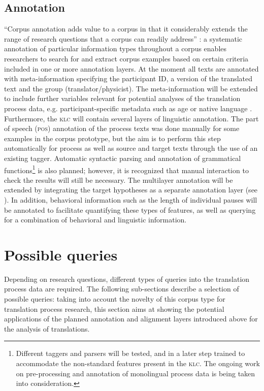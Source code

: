 \documentclass[output=paper]{LSP/langsci}
\begin{document}
\subsection{Annotation} \label{sec:1:2:3}
“Corpus annotation adds value to a corpus in that it considerably extends the range of research questions that a corpus can readily address” \citep[29]{McEnery2006}: a systematic annotation of particular information types throughout a corpus enables researchers to search for and extract corpus examples based on certain criteria included in one or more annotation layers. At the moment all texts are annotated with meta-information specifying the participant ID, a version of the translated text and the group (translator/physicist). The meta-information will be extended to include further variables relevant for potential analyses of the translation process data, e.g. participant-specific metadata such as age or native language \citep[see][]{Hvelplund2012}. Furthermore, the \textsc{klc} will contain several layers of linguistic annotation. The part of speech (\textsc{pos}) annotation of the process texts was done manually for some examples in the corpus prototype, but the aim is to perform this step automatically for process as well as source and target texts through the use of an existing tagger. Automatic syntactic parsing and annotation of grammatical functions\footnote{Different taggers and parsers will be tested, and in a later step trained to accommodate the non-standard features present in the \textsc{klc}. The ongoing work on pre-processing and annotation of monolingual process data \citep{Leijten2012,Macken2012} is being taken into consideration.} is also planned; however, it is recognized that manual interaction to check the results will still be necessary. The multilayer annotation \citep[see][]{Hansen-Schirra2006} will be extended by integrating the target hypotheses as a separate annotation layer (see ). In addition, behavioral information such as the length of individual pauses \citep[see][]{Alves2009,Alves2011} will be annotated to facilitate quantifying these types of features, as well as querying for a combination of behavioral and linguistic information.

\section{Possible queries} \label{sec:1:3}
Depending on research questions, different types of queries into the translation process data are required. The following sub-sections describe a selection of possible queries: taking into account the novelty of this corpus type for translation process research, this section aims at showing the potential applications of the planned annotation and alignment layers introduced above for the analysis of translations.
\end{document}
